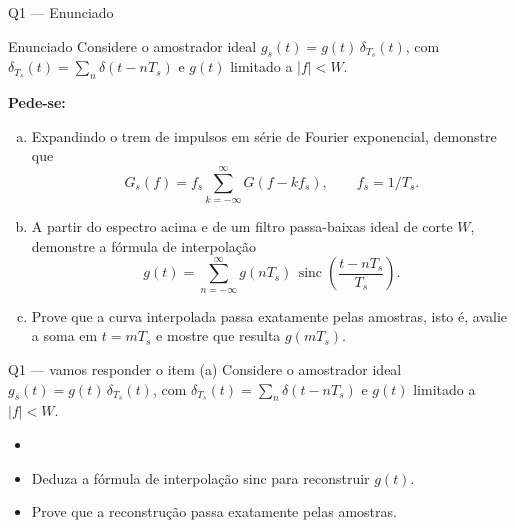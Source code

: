 \documentclass[aspectratio=169]{beamer}
\newcommand{\sinc}{\operatorname{sinc}}
\begin{document}
\begin{frame}[allowframebreaks]{Q1 --- Enunciado}
  \small
  \begin{block}{Enunciado}
  Considere o amostrador ideal $g_s(t)=g(t)\,\delta_{T_s}(t)$, com $\delta_{T_s}(t)=\sum_{n}\delta(t-nT_s)$ e $g(t)$ limitado a $|f|<W$.
  \end{block}
  \vspace{0.1cm}
  \textbf{Pede-se:}
  \begin{enumerate}[(a)]
    \item Expandindo o trem de impulsos em série de Fourier exponencial, demonstre que \[ G_s(f)=f_s\sum_{k=-\infty}^{\infty}G(f-kf_s),\qquad f_s=1/T_s . \]
    \item A partir do espectro acima e de um filtro passa-baixas ideal de corte $W$, demonstre a fórmula de interpolação \[ g(t)=\sum_{n=-\infty}^{\infty} g(nT_s)\, \sinc\!\left(\frac{t-nT_s}{T_s}\right). \]
    \item Prove que a curva interpolada passa exatamente pelas amostras, isto é, avalie a soma em $t=mT_s$ e mostre que resulta $g(mT_s)$.
  \end{enumerate}
\end{frame}

\begin{frame}{Q1 --- vamos responder o item (a)}
  \small
  \textcolor{gray!55}{Considere o amostrador ideal
  $g_s(t)=g(t)\,\delta_{T_s}(t)$, com $\delta_{T_s}(t)=\sum_{n}\delta(t-nT_s)$
  e $g(t)$ limitado a $|f|<W$.}
  \vspace{0.4cm}
  \begin{itemize}
    \item[\textcolor{unbprimary}{(a)}]
    \item[\textcolor{gray!55}{(b)}] \textcolor{gray!55}{Deduza a fórmula de interpolação sinc para reconstruir $g(t)$.}
    \item[\textcolor{gray!55}{(c)}] \textcolor{gray!55}{Prove que a reconstrução passa exatamente pelas amostras.}
  \end{itemize}
\end{frame}
\end{document}
